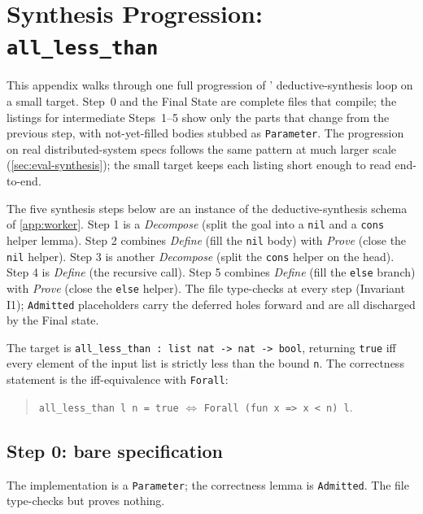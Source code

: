 \section{Synthesis Progression: \texttt{all\_less\_than}}
\label{app:progression}


This appendix walks through one full progression of \sys{}' deductive-synthesis loop on a small target. Step~0 and the Final State are complete \coq{} files that compile; the listings for intermediate Steps~1--5 show only the parts that change from the previous step, with not-yet-filled bodies stubbed as \texttt{Parameter}. The progression on real distributed-system specs follows the same pattern at much larger scale (\cref{sec:eval-synthesis}); the small target keeps each listing short enough to read end-to-end.

The five synthesis steps below are an instance of the deductive-synthesis schema of \cref{app:worker}. Step 1 is a \emph{Decompose} (split the goal into a \texttt{nil} and a \texttt{cons} helper lemma). Step 2 combines \emph{Define} (fill the \texttt{nil} body) with \emph{Prove} (close the \texttt{nil} helper). Step 3 is another \emph{Decompose} (split the \texttt{cons} helper on the head). Step 4 is \emph{Define} (the recursive call). Step 5 combines \emph{Define} (fill the \texttt{else} branch) with \emph{Prove} (close the \texttt{else} helper). The file type-checks at every step (Invariant I1); \texttt{Admitted} placeholders carry the deferred holes forward and are all discharged by the Final state.

The target is \texttt{all\_less\_than : list nat -> nat -> bool}, returning \texttt{true} iff every element of the input list is strictly less than the bound \texttt{n}. The correctness statement is the iff-equivalence with \texttt{Forall}:
\begin{quote}
  \texttt{all\_less\_than l n = true} $\Leftrightarrow$ \texttt{Forall (fun x => x < n) l}.
\end{quote}

\subsection{Step 0: bare specification}
The implementation is a \texttt{Parameter}; the correctness lemma is \texttt{Admitted}. The file type-checks but proves nothing.

